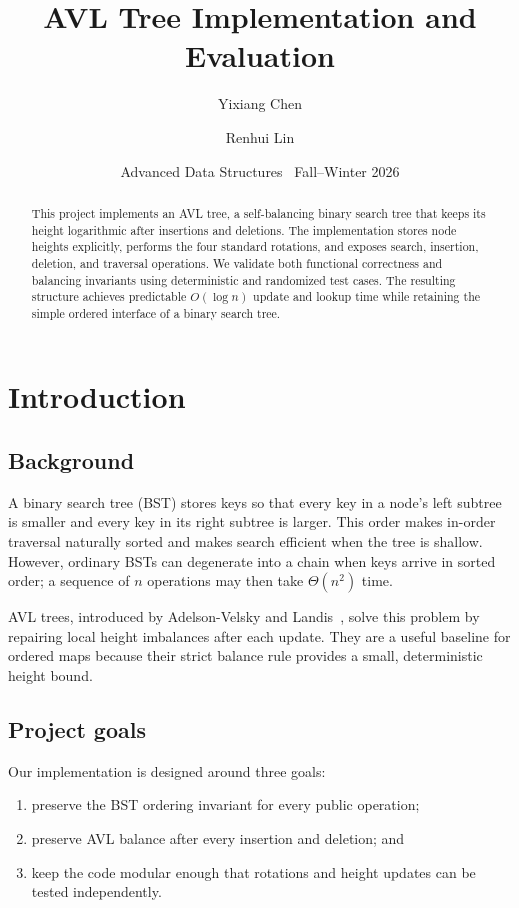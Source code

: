 \documentclass[lang=cn,a4paper,newtx,bibend=biber]{elegantpaper}
\title{AVL Tree Implementation and Evaluation}
\author{Yixiang Chen \and Renhui Lin}
\date{Advanced Data Structures \textbar\ Fall--Winter 2026}
\begin{document}
\maketitle

\begin{abstract}
This project implements an AVL tree, a self-balancing binary search tree that keeps its height logarithmic after insertions and deletions. The implementation stores node heights explicitly, performs the four standard rotations, and exposes search, insertion, deletion, and traversal operations. We validate both functional correctness and balancing invariants using deterministic and randomized test cases. The resulting structure achieves predictable $O(\log n)$ update and lookup time while retaining the simple ordered interface of a binary search tree.
\end{abstract}

\newpage
\tableofcontents
\newpage

\section{Introduction}
\subsection{Background}
A binary search tree (BST) stores keys so that every key in a node's left subtree is smaller and every key in its right subtree is larger. This order makes in-order traversal naturally sorted and makes search efficient when the tree is shallow. However, ordinary BSTs can degenerate into a chain when keys arrive in sorted order; a sequence of $n$ operations may then take $\Theta(n^2)$ time.

AVL trees, introduced by Adelson-Velsky and Landis~\cite{adelson1963}, solve this problem by repairing local height imbalances after each update. They are a useful baseline for ordered maps because their strict balance rule provides a small, deterministic height bound.

\subsection{Project goals}
Our implementation is designed around three goals:
\begin{enumerate}[label=\textcolor{avlblue}{\arabic*.},leftmargin=2em]
  \item preserve the BST ordering invariant for every public operation;
  \item preserve AVL balance after every insertion and deletion; and
  \item keep the code modular enough that rotations and height updates can be tested independently.
\end{enumerate}
\end{document}
